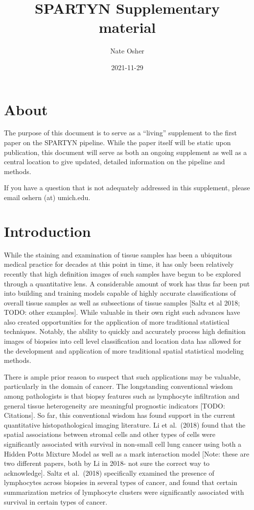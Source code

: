 \documentclass[
]{book}
\title{SPARTYN Supplementary material}
\author{Nate Osher}
\date{2021-11-29}
\begin{document}
\maketitle

{
\setcounter{tocdepth}{1}
\tableofcontents
}
\hypertarget{about}{%
\chapter{About}\label{about}}

The purpose of this document is to serve as a ``living'' supplement to the
first paper on the SPARTYN pipeline. While the paper itself will be
static upon publication, this document will serve as both an ongoing
supplement as well as a central location to give updated, detailed
information on the pipeline and methods.

If you have a question that is not adequately addressed in this
supplement, please email oshern (at) umich.edu.

\hypertarget{introduction}{%
\chapter{Introduction}\label{introduction}}

While the staining and examination of tissue samples has been a
ubiquitous medical practice for decades at this point in time, it has
only been relatively recently that high definition images of such
samples have begun to be explored through a quantitative lens. A
considerable amount of work has thus far been put into building and
training models capable of highly accurate classifications of overall
tissue samples as well as subsections of tissue samples {[}Saltz et al
2018; TODO: other examples{]}. While valuable in their own right such
advances have also created opportunities for the application of more
traditional statistical techniques. Notably, the ability to quickly and
accurately process high definition images of biopsies into cell level
classification and location data has allowed for the development and
application of more traditional spatial statistical modeling methods.

There is ample prior reason to suspect that such applications may be
valuable, particularly in the domain of cancer. The longstanding
conventional wisdom among pathologists is that biopsy features such as
lymphocyte infiltration and general tissue heterogeneity are meaningful
prognostic indicators {[}TODO: Citations{]}. So far, this conventional
wisdom has found support in the current quantitative histopathological
imaging literature. Li et al.~(2018) found that the spatial associations
between stromal cells and other types of cells were significantly
associated with survival in non-small cell lung cancer using both a
Hidden Potts Mixture Model as well as a mark interaction model {[}Note:
these are two different papers, both by Li in 2018- not sure the correct
way to acknowledge{]}. Saltz et al.~(2018) specifically examined the
presence of lymphocytes across biopsies in several types of cancer, and
found that certain summarization metrics of lymphocyte clusters were
significantly associated with survival in certain types of cancer.
\end{document}
